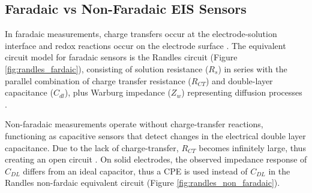 \subsection{Faradaic vs Non-Faradaic EIS Sensors}

In faradaic measurements, charge transfers occur at the electrode-solution interface and redox reactions occur on the electrode surface \cite{xieReviewAdvancementsNanoscale2020a}. The equivalent circuit model for faradaic sensors is the Randles circuit (Figure \ref{fig:randles_fardaic}), consisting of solution resistance ($R_s$) in series with the parallel combination of charge transfer resistance ($R_{CT}$) and double-layer capacitance ($C_{dl}$), plus Warburg impedance ($Z_w$) representing diffusion processes \cite{xieReviewAdvancementsNanoscale2020a}.

Non-faradaic measurements operate without charge-transfer reactions, functioning as capacitive sensors that detect changes in the electrical double layer capacitance. Due to the lack of charge-transfer, $R_{CT}$ becomes infinitely large, thus creating an open circuit \cite{xieReviewAdvancementsNanoscale2020a}. On solid electrodes, the observed impedance response of $C_{DL}$ differs from an ideal capacitor, thus a \ac{CPE} is used instead of $C_{DL}$ in the Randles non-fardaic equivalent circuit (Figure \ref{fig:randles_non_faradaic}).  

